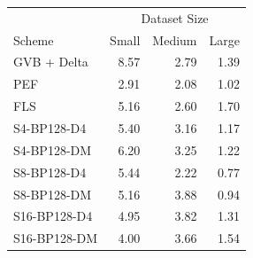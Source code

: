 \begin{tabular}{lrrr}
\toprule
 & \multicolumn{3}{c}{Dataset Size} \\
Scheme & Small & Medium & Large \\
\midrule
GVB + Delta & 8.57 & 2.79 & 1.39 \\
PEF & 2.91 & 2.08 & 1.02 \\
FLS & 5.16 & 2.60 & 1.70 \\
S4-BP128-D4 & 5.40 & 3.16 & 1.17 \\
S4-BP128-DM & 6.20 & 3.25 & 1.22 \\
S8-BP128-D4 & 5.44 & 2.22 & 0.77 \\
S8-BP128-DM & 5.16 & 3.88 & 0.94 \\
S16-BP128-D4 & 4.95 & 3.82 & 1.31 \\
S16-BP128-DM & 4.00 & 3.66 & 1.54 \\
\bottomrule
\end{tabular}
